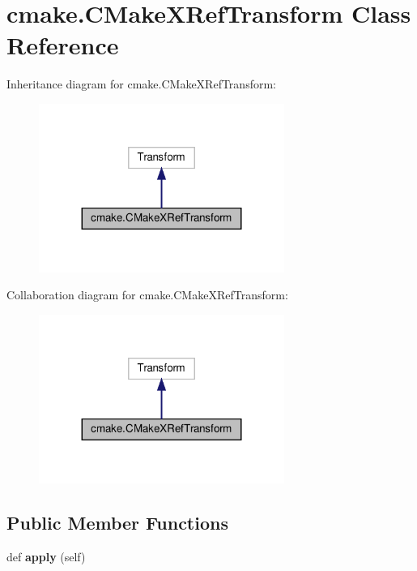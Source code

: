 \hypertarget{classcmake_1_1CMakeXRefTransform}{}\section{cmake.\+C\+Make\+X\+Ref\+Transform Class Reference}
\label{classcmake_1_1CMakeXRefTransform}


Inheritance diagram for cmake.\+C\+Make\+X\+Ref\+Transform\+:
\nopagebreak
\begin{figure}[H]
\begin{center}
\leavevmode
\includegraphics[width=227pt]{classcmake_1_1CMakeXRefTransform__inherit__graph}
\end{center}
\end{figure}


Collaboration diagram for cmake.\+C\+Make\+X\+Ref\+Transform\+:
\nopagebreak
\begin{figure}[H]
\begin{center}
\leavevmode
\includegraphics[width=227pt]{classcmake_1_1CMakeXRefTransform__coll__graph}
\end{center}
\end{figure}
\subsection*{Public Member Functions}
\begin{DoxyCompactItemize}
\item 
\mbox{\label{classcmake_1_1CMakeXRefTransform_a8727f9aa2814e7491695df2544981eb6}} 
def {\bfseries apply} (self)
\end{DoxyCompactItemize}
